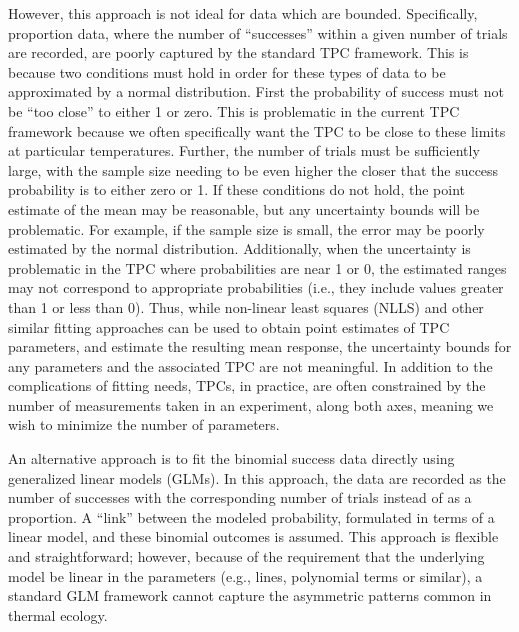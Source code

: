 \documentclass[
]{article}
\begin{document}
However, this approach is not ideal for data which are bounded.
Specifically, proportion data, where the number of ``successes'' within
a given number of trials are recorded, are poorly captured by the
standard TPC framework. This is because two conditions must hold in
order for these types of data to be approximated by a normal
distribution. First the probability of success must not be ``too close''
to either 1 or zero. This is problematic in the current TPC framework
because we often specifically want the TPC to be close to these limits
at particular temperatures. Further, the number of trials must be
sufficiently large, with the sample size needing to be even higher the
closer that the success probability is to either zero or 1. If these
conditions do not hold, the point estimate of the mean may be
reasonable, but any uncertainty bounds will be problematic. For example,
if the sample size is small, the error may be poorly estimated by the
normal distribution. Additionally, when the uncertainty is problematic
in the TPC where probabilities are near 1 or 0, the estimated ranges may
not correspond to appropriate probabilities (i.e., they include values
greater than 1 or less than 0). Thus, while non-linear least squares
(NLLS) and other similar fitting approaches can be used to obtain point
estimates of TPC parameters, and estimate the resulting mean response,
the uncertainty bounds for any parameters and the associated TPC are not
meaningful. In addition to the complications of fitting needs, TPCs, in
practice, are often constrained by the number of measurements taken in
an experiment, along both axes, meaning we wish to minimize the number
of parameters.

An alternative approach is to fit the binomial success data directly
using generalized linear models (GLMs). In this approach, the data are
recorded as the number of successes with the corresponding number of
trials instead of as a proportion. A ``link'' between the modeled
probability, formulated in terms of a linear model, and these binomial
outcomes is assumed. This approach is flexible and straightforward;
however, because of the requirement that the underlying model be linear
in the parameters (e.g., lines, polynomial terms or similar), a standard
GLM framework cannot capture the asymmetric patterns common in thermal
ecology.
\end{document}
